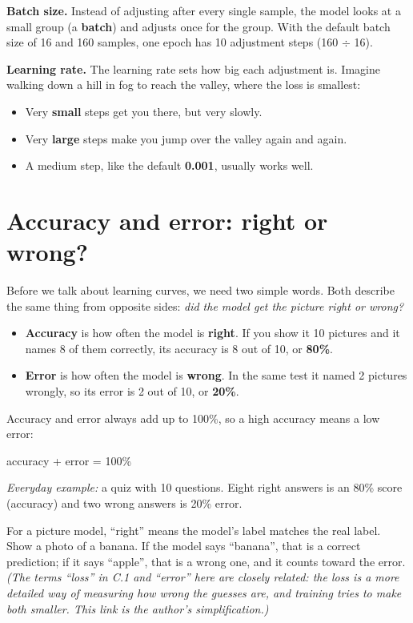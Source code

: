 \textbf{Batch size.} Instead of adjusting after every single sample, the model looks at a small group (a \textbf{batch}) and adjusts once for the group. With the default batch size of 16 and 160 samples, one epoch has 10 adjustment steps (160 \ensuremath{\div} 16).


\textbf{Learning rate.} The learning rate sets how big each adjustment is. Imagine walking down a hill in fog to reach the valley, where the loss is smallest:


\begin{itemize}
\item Very \textbf{small} steps get you there, but very slowly.
\item Very \textbf{large} steps make you jump over the valley again and again.
\item A medium step, like the default \textbf{0.001}, usually works well.
\end{itemize}

\section{Accuracy and error: right or wrong?}

Before we talk about learning curves, we need two simple words. Both describe the same thing from opposite sides: \emph{did the model get the picture right or wrong?}


\begin{itemize}
\item \textbf{Accuracy} is how often the model is \textbf{right}. If you show it 10 pictures and it names 8 of them correctly, its accuracy is 8 out of 10, or \textbf{80\%}.
\item \textbf{Error} is how often the model is \textbf{wrong}. In the same test it named 2 pictures wrongly, so its error is 2 out of 10, or \textbf{20\%}.
\end{itemize}

Accuracy and error always add up to 100\%, so a high accuracy means a low error:


accuracy + error = 100\%


\emph{Everyday example:} a quiz with 10 questions. Eight right answers is an 80\% score (accuracy) and two wrong answers is 20\% error.


For a picture model, “right” means the model’s label matches the real label. Show a photo of a banana. If the model says “banana”, that is a correct prediction; if it says “apple”, that is a wrong one, and it counts toward the error. \emph{(The terms “loss” in C.1 and “error” here are closely related: the loss is a more detailed way of measuring how wrong the guesses are, and training tries to make both smaller. This link is the author’s simplification.)}


